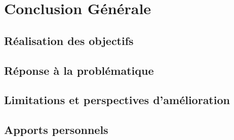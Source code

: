 \chapter{Conclusion Générale}
\label{chap:conclusion}

\section{Réalisation des objectifs}
\section{Réponse à la problématique}
\section{Limitations et perspectives d'amélioration}
\section{Apports personnels}